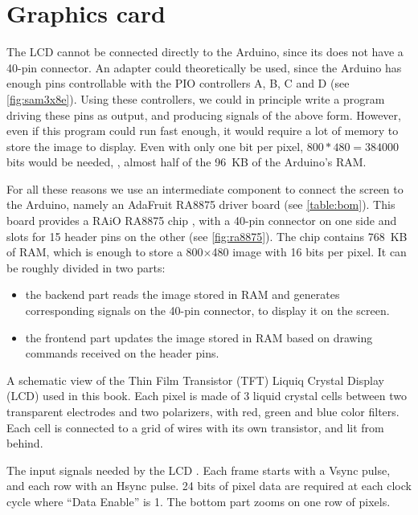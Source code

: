 \section{Graphics card}

The LCD cannot be connected directly to the Arduino, since its does not have a
40-pin connector. An adapter could theoretically be used, since the Arduino has
enough pins controllable with the PIO controllers A, B, C and D (see
\cref{fig:sam3x8e}). Using these controllers, we could in principle write a
program driving these pins as output, and producing signals of the above form.
However, even if this program could run fast enough, it would require a lot of
memory to store the image to display. Even with only one bit per pixel,
$800*480=384000$ bits would be needed, \ie, almost half of the 96~KB of the
Arduino's RAM.

For all these reasons we use an intermediate component to connect the screen to
the Arduino, namely an AdaFruit RA8875 driver board (see \cref{table:bom}).
This board provides a RAiO RA8875 chip \cite{RA8875}, with a 40-pin connector
on one side and slots for 15 header pins on the other (see \cref{fig:ra8875}).
The chip contains 768~KB of RAM, which is enough to store a 800$\times$480 image
with 16 bits per pixel. It can be roughly divided in two parts:
\begin{itemize}
  \item the backend part reads the image stored in RAM and generates
  corresponding signals on the 40-pin connector, to display it on the screen.

  \item the frontend part updates the image stored in RAM based on drawing
  commands received on the header pins.
\end{itemize}

\begin{Figure}
  

  \caption{A schematic view of the Thin Film Transistor (TFT) Liquiq Crystal
  Display (LCD) used in this book. Each pixel is made of 3 liquid crystal cells
  between two transparent electrodes and two polarizers, with red, green and
  blue color filters. Each cell is connected to a grid of wires with its own
  transistor, and lit from behind.}\label{fig:lcd-structure}
\end{Figure}

\begin{Figure}
  

  \caption{The input signals needed by the LCD \cite{TFTScreen}. Each frame
  starts with a Vsync pulse, and each row with an Hsync pulse. 24 bits of pixel
  data are required at each clock cycle where ``Data Enable'' is 1. The bottom
  part zooms on one row of pixels.}\label{fig:lcd-signals}
\end{Figure}

